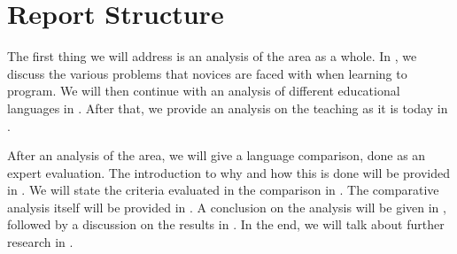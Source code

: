 \section{Report Structure}
The first thing we will address is an analysis of the area as a whole. In , we discuss the various problems that novices are faced with when learning to program. We will then continue with an analysis of different educational languages in . After that, we provide an analysis on the teaching as it is today in .

After an analysis of the area, we will give a language comparison, done as an expert evaluation. The introduction to why and how this is done will be provided in . We will state the criteria evaluated in the comparison in . The comparative analysis itself will be provided in . A conclusion on the analysis will be given in , followed by a discussion on the results in . In the end, we will talk about further research in .





